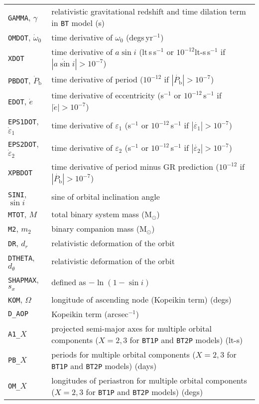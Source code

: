 \begin{longtable}{p{}|p{}}
{\tt GAMMA}, $\gamma$ & relativistic gravitational redshift and time dilation term in {\tt BT} model (s) \\
{\tt OMDOT}, $\dot{\omega}_0$ & time derivative of $\omega_0$ (degs\,yr$^{-1}$) \\
{\tt XDOT} & time derivative of $a\sin{i}$ (lt\,s\,s$^{-1}$ or $10^{-12}$lt-s\,s$^{-1}$ if $|\dot{a\sin{i}}| > 10^{-7}$)  \\
{\tt PBDOT}, $\dot{P}_{\text{b}}$ & time derivative of period ($10^{-12}$ if $|\dot{P_{\text{b}}}| > 10^{-7}$) \\
{\tt EDOT}, $\dot{e}$ & time derivative of eccentricity (s$^{-1}$ or $10^{-12}$\,s$^{-1}$ if $|\dot{e}| > 10^{-7}$) \\
{\tt EPS1DOT}, $\dot{\varepsilon}_1$ & time derivative of $\varepsilon_1$ (s$^{-1}$ or $10^{-12}$\,s$^{-1}$ if $|\dot{\varepsilon_1}| > 10^{-7}$) \\
{\tt EPS2DOT}, $\dot{\varepsilon}_2$ & time derivative of $\varepsilon_2$ (s$^{-1}$ or $10^{-12}$\,s$^{-1}$ if $|\dot{\varepsilon_2}| > 10^{-7}$) \\
{\tt XPBDOT} & time derivative of period minus GR prediction ($10^{-12}$ if $|\dot{P_{\text{b}}}| > 10^{-7}$) \\
{\tt SINI}, $\sin{i}$ & sine of orbital inclination angle \\
{\tt MTOT}, $M$ & total binary system mass (M$_{\odot}$) \\
{\tt M2}, $m_2$ & binary companion mass (M$_{\odot}$) \\
{\tt DR}, $d_r$ & relativistic deformation of the orbit \\
{\tt DTHETA}, $d_{\theta}$ & relativistic deformation of the orbit \\
{\tt SHAPMAX}, $s_x$ & defined as $-\ln{(1-\sin{i})}$ \\
{\tt KOM}, $\Omega$ & longitude of ascending node (Kopeikin term) (degs) \\
{\tt D\_AOP} & Kopeikin term (arcsec$^{-1}$) \citep[see, e.g., Section~2.7.1 of][]{2006MNRAS.372.1549E} \\
{\tt A1\_}$X$ & projected semi-major axes for multiple orbital components ($X=2,3$ for {\tt BT1P} and {\tt BT2P} models) (lt-s) \\
{\tt PB\_}$X$ & periods for multiple orbital components ($X=2,3$ for {\tt BT1P} and {\tt BT2P} models) (days) \\
{\tt OM\_}$X$ & longitudes of periastron for multiple orbital components ($X=2,3$ for {\tt BT1P} and {\tt BT2P} models) (degs) \\

\end{longtable}
